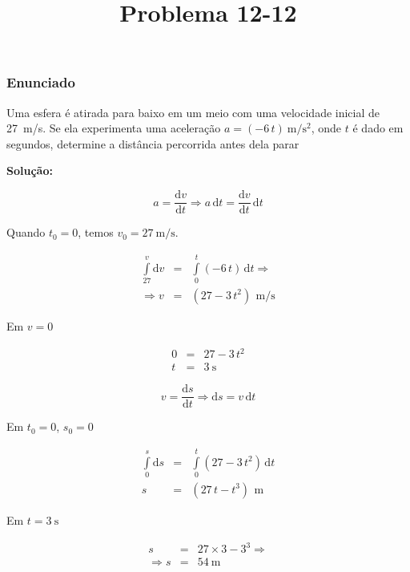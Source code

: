 \documentclass[12pt]{beamer}
\begin{document}
	\title{Problema 12-12}
\begin{frame}[plain]
	\maketitle
\end{frame}

\begin{frame}
	\frametitle{Enunciado}
	\begin{minipage}{.5\linewidth}
	Uma esfera é atirada para baixo em um meio com uma velocidade inicial de \SI{27}{\meter/\second}. Se ela experimenta uma aceleração $a=(-6\,t)\SI{}{\meter/\second^{2}}$, onde $t$ é dado em segundos, determine a distância percorrida antes dela parar
	\end{minipage}
	
	\textbf{Solução:}
	
	\begin{equation}
		a=\dfrac{\text{d}v}{\text{d}t} \Rightarrow a\,\text{d}t=\dfrac{\text{d}v}{\text{d}t}\,\text{d}t
	\end{equation}
	
	Quando $t_{0}=0$, temos $v_{0}=\SI{27}{\meter/\second}$.
	
	\begin{eqnarray}
		\int\limits_{27}^{v}\text{d}v&=&\int\limits_{0}^{t}(-6\,t)\,\text{d}t \Rightarrow\\
		\Rightarrow v&=&(27-3\,t^{2})\,\SI{}{\meter/\second}
	\end{eqnarray}
\end{frame}

\begin{frame}
	Em $v=0$
	
	\begin{eqnarray}
		0&=&27-3\,t^{2}\\
		t&=&\SI{3}{\second}
	\end{eqnarray}

	\begin{equation}
		v=\dfrac{\text{d}s}{\text{d}t} \Rightarrow \text{d}s=v\,\text{d}t
	\end{equation}
	
	Em $t_{0}=0$, $s_{0}=0$
	
	\begin{eqnarray}
		\int\limits_{0}^{s}\text{d}s&=&\int\limits_{0}^{t}(27-3\,t^{2})\,\text{d}t\\
		s&=&(27\,t-t^{3})\,\SI{}{\meter}
	\end{eqnarray}
\end{frame}

\begin{frame}
	Em $t=\SI{3}{\second}$
	
	\begin{eqnarray}
		s&=&27\times 3-3^{3} \Rightarrow\\
		\Rightarrow s&=&\SI{54}{\meter}
	\end{eqnarray}
\end{frame}
\end{document}
